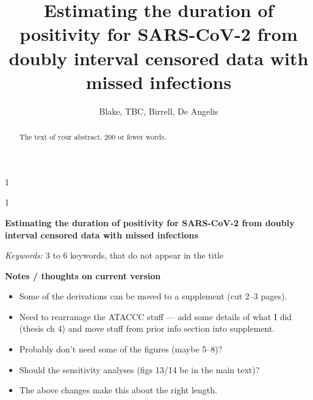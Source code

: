 \documentclass[12pt]{article}
\newcommand{\blind}{1}
\newcommand{\fulltitle}{Estimating the duration of positivity for SARS-CoV-2 from doubly interval censored data with missed infections}
\begin{document}
%

\def\spacingset#1{\renewcommand{\baselinestretch}%
{#1}\small\normalsize} \spacingset{1}



\blind
{
  \title{\bf \fulltitle}
  \author{%
    Blake, TBC, Birrell, De Angelis  
  }
  \maketitle
} \fi

\blind
{
  \bigskip
  \bigskip
  \bigskip
  \begin{center}
    {\LARGE\bf \fulltitle}
\end{center}
  \medskip
} \fi

\bigskip
\begin{abstract}
The text of your abstract. 200 or fewer words.
\end{abstract}

\noindent%
{\it Keywords:}  3 to 6 keywords, that do not appear in the title
\vfill

\newpage

\textbf{Notes / thoughts on current version}
\begin{itemize}
    \item Some of the derivations can be moved to a supplement (cut 2--3 pages).
    \item Need to rearranage the ATACCC stuff --- add some details of what I did (thesis ch 4) and move stuff from prior info section into supplement.
    \item Probably don't need some of the figures (maybe 5--8)?
    \item Should the sensitivity analyses (figs 13/14 be in the main text)?
    \item The above changes make this about the right length.
\end{itemize}
\end{document}
